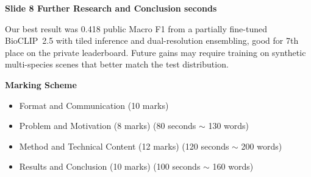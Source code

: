 \documentclass[11pt]{article}
\begin{document}
\noindent\textbf{Slide 8 \quad Further Research and Conclusion  seconds}

Our best result was 0.418 public Macro F1 from a partially fine-tuned
BioCLIP~2.5 with tiled inference and dual-resolution ensembling, good for
7th place on the private leaderboard. Future gains may require training on
synthetic multi-species scenes that better match the test distribution.

\vspace{10pt}

\noindent\textbf{Marking Scheme}
\begin{itemize}
  \item Format and Communication (10 marks)
  \item Problem and Motivation (8 marks) (80 seconds $\sim$ 130 words)
  \item Method and Technical Content (12 marks) (120 seconds $\sim$ 200 words)
  \item Results and Conclusion (10 marks) (100 seconds $\sim$ 160 words)
\end{itemize}
\end{document}
